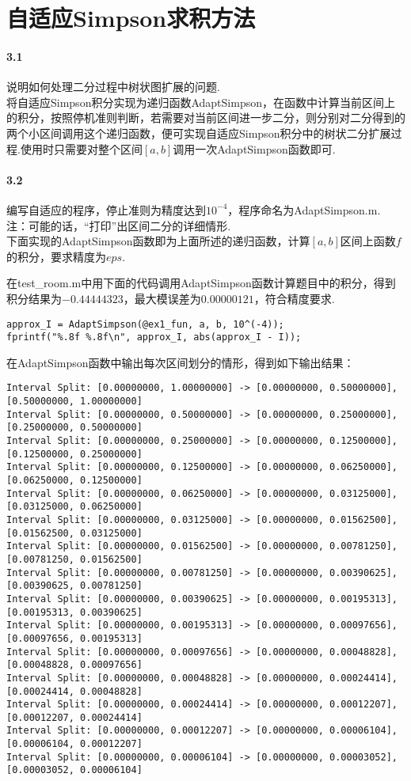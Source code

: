 \section{自适应Simpson求积方法}
\paragraph{3.1} 说明如何处理二分过程中树状图扩展的问题.\\
将自适应Simpson积分实现为递归函数AdaptSimpson，在函数中计算当前区间上的积分，按照停机准则判断，若需要对当前区间进一步二分，则分别对二分得到的两个小区间调用这个递归函数，便可实现自适应Simpson积分中的树状二分扩展过程.使用时只需要对整个区间$[a, b]$调用一次AdaptSimpson函数即可.
\paragraph{3.2} 编写自适应的程序，停止准则为精度达到$10^{-4}$，程序命名为AdaptSimpson.m.\\
注：可能的话，“打印”出区间二分的详细情形.\\
下面实现的AdaptSimpson函数即为上面所述的递归函数，计算$[a, b]$区间上函数$f$的积分，要求精度为$eps$.

在test\_room.m中用下面的代码调用AdaptSimpson函数计算题目中的积分，得到积分结果为$-0.44444323$，最大模误差为$0.00000121$，符合精度要求.
\begin{lstlisting}
approx_I = AdaptSimpson(@ex1_fun, a, b, 10^(-4));
fprintf("%.8f %.8f\n", approx_I, abs(approx_I - I));
\end{lstlisting}
在AdaptSimpson函数中输出每次区间划分的情形，得到如下输出结果：
\begin{lstlisting}
Interval Split: [0.00000000, 1.00000000] -> [0.00000000, 0.50000000], [0.50000000, 1.00000000] 
Interval Split: [0.00000000, 0.50000000] -> [0.00000000, 0.25000000], [0.25000000, 0.50000000] 
Interval Split: [0.00000000, 0.25000000] -> [0.00000000, 0.12500000], [0.12500000, 0.25000000] 
Interval Split: [0.00000000, 0.12500000] -> [0.00000000, 0.06250000], [0.06250000, 0.12500000] 
Interval Split: [0.00000000, 0.06250000] -> [0.00000000, 0.03125000], [0.03125000, 0.06250000] 
Interval Split: [0.00000000, 0.03125000] -> [0.00000000, 0.01562500], [0.01562500, 0.03125000] 
Interval Split: [0.00000000, 0.01562500] -> [0.00000000, 0.00781250], [0.00781250, 0.01562500] 
Interval Split: [0.00000000, 0.00781250] -> [0.00000000, 0.00390625], [0.00390625, 0.00781250] 
Interval Split: [0.00000000, 0.00390625] -> [0.00000000, 0.00195313], [0.00195313, 0.00390625] 
Interval Split: [0.00000000, 0.00195313] -> [0.00000000, 0.00097656], [0.00097656, 0.00195313] 
Interval Split: [0.00000000, 0.00097656] -> [0.00000000, 0.00048828], [0.00048828, 0.00097656] 
Interval Split: [0.00000000, 0.00048828] -> [0.00000000, 0.00024414], [0.00024414, 0.00048828] 
Interval Split: [0.00000000, 0.00024414] -> [0.00000000, 0.00012207], [0.00012207, 0.00024414] 
Interval Split: [0.00000000, 0.00012207] -> [0.00000000, 0.00006104], [0.00006104, 0.00012207] 
Interval Split: [0.00000000, 0.00006104] -> [0.00000000, 0.00003052], [0.00003052, 0.00006104]
\end{lstlisting}


